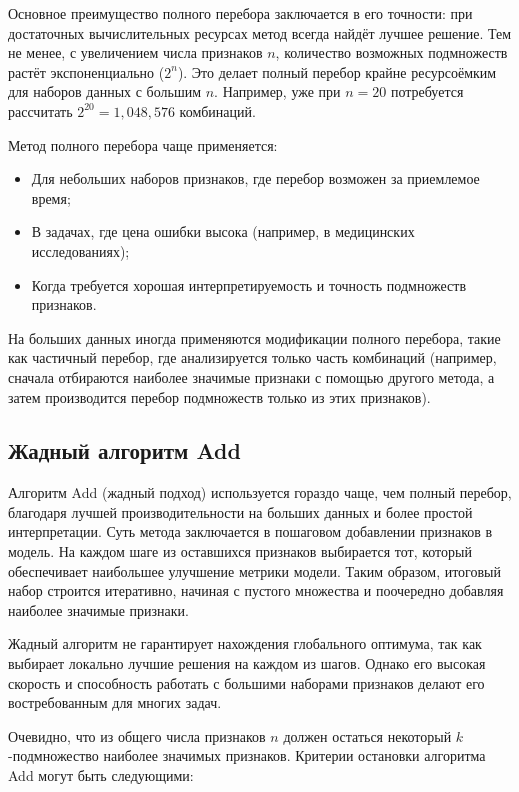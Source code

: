 Основное преимущество полного перебора заключается в его точности: при достаточных вычислительных ресурсах метод всегда найдёт лучшее решение. Тем не менее, с увеличением числа признаков $n$, количество возможных подмножеств растёт экспоненциально ($2^n$). Это делает полный перебор крайне ресурсоёмким для наборов данных с большим $n$. Например, уже при $n=20$ потребуется рассчитать $2^{20} = 1,048,576$ комбинаций.

Метод полного перебора чаще применяется:
\begin{itemize}
    \item Для небольших наборов признаков, где перебор возможен за приемлемое время;
    \item В задачах, где цена ошибки высока (например, в медицинских исследованиях);
    \item Когда требуется хорошая интерпретируемость и точность подмножеств признаков.
\end{itemize}

На больших данных иногда применяются модификации полного перебора, такие как частичный перебор, где анализируется только часть комбинаций (например, сначала отбираются наиболее значимые признаки с помощью другого метода, а затем производится перебор подмножеств только из этих признаков).

\subsection{Жадный алгоритм Add}

Алгоритм Add (жадный подход) используется гораздо чаще, чем полный перебор, благодаря лучшей производительности на больших данных и более простой интерпретации. Суть метода заключается в пошаговом добавлении признаков в модель. На каждом шаге из оставшихся признаков выбирается тот, который обеспечивает наибольшее улучшение метрики модели. Таким образом, итоговый набор строится итеративно, начиная с пустого множества и поочередно добавляя наиболее значимые признаки.

Жадный алгоритм не гарантирует нахождения глобального оптимума, так как выбирает локально лучшие решения на каждом из шагов. Однако его высокая скорость и способность работать с большими наборами признаков делают его востребованным для многих задач.

Очевидно, что из общего числа признаков $n$ должен остаться некоторый $k$-подмножество наиболее значимых признаков. Критерии остановки алгоритма Add могут быть следующими:

